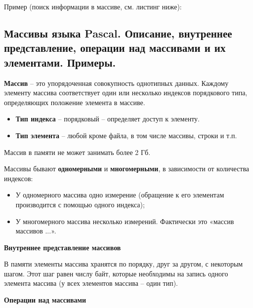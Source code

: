 \noindent
Пример (поиск информации в массиве, см. листинг ниже): 





\newpage\subsection{Массивы языка Pascal. Описание, внутреннее представление, операции над массивами и 
их элементами. Примеры. }

\begin{myquote}
\end{myquote}

{\bf{Массив}} – это упорядоченная совокупность однотипных данных. Каждому элементу массива соответствует один или несколько индексов порядкового типа, определяющих положение элемента в массиве.


\begin{itemize}
    \item {\bf{Тип индекса}} – порядковый – определяет доступ к элементу. 

    \item {\bf{Тип элемента}} – любой кроме файла, в том числе массивы, строки и т.п.
\end{itemize}

\noindent
Массив в памяти не может занимать более 2 Гб. 

\noindent
Массивы бывают {\bf{одномерными}} и {\bf{многомерными}}, в зависимости от количества индексов:
\begin{itemize}
    \item У одномерного массива одно измерение (обращение к его элементам производится с помощью одного индекса);

    \item У многомерного массива несколько измерений. Фактически это «массив массивов ...».
\end{itemize}

\noindent
{\bf{Внутреннее представление массивов}}

В памяти элементы массива хранятся по порядку, друг за другом, с некоторым шагом. Этот шаг равен числу байт, которые необходимы на запись одного элемента массива (у всех элементов массива – один тип).

\noindent
{\bf{Операции над массивами}}

